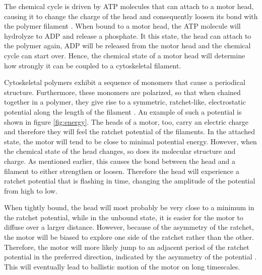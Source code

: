 \documentclass[aps,pre,twocolumn,showpacs,showkeys,superscriptaddress,floatfix]{revtex4-1}
\begin{document}
The chemical cycle is driven by ATP molecules that can attach to a motor head, causing it to change the charge of the head and consequently loosen its bond with the polymer filament \cite{adelstein1980regulation}. 
When bound to a motor head, the ATP molecule will hydrolyze to ADP and release a phosphate. 
It this state, the head can attach to the polymer again, ADP will be released from the motor head and the chemical cycle can start over. 
Hence, the chemical state of a motor head will determine how strongly it can be coupled to a cytoskeletal filament. 


Cytoskeletal polymers exhibit a sequence of monomers that cause a periodical structure. 
Furthermore, these monomers are polarized, so that when chained together in a polymer, they give rise to a symmetric, ratchet-like, electrostatic potential along the length of the filament \cite{Nie2014,nie2014conformational}. 
An example of such a potential is shown in figure \ref{fig:energy}. 
The heads of a motor, too, carry an electric charge and therefore they will feel the ratchet potential of the filaments. 
In the attached state, the motor will tend to be close to minimal potential energy. 
However, when the chemical state of the head changes, so does its molecular structure and charge. 
As mentioned earlier, this causes the bond between the head and a filament to either strengthen or loosen. 
Therefore the head will experience a ratchet potential that is flashing in time, changing the amplitude of the potential from high to low.


When tightly bound, the head will most probably be very close to a minimum in the ratchet potential, while in the unbound state, it is easier for the motor to diffuse over a larger distance. 
However, because of the asymmetry of the ratchet, the motor will be biased to explore one side of the ratchet rather than the other. 
Therefore, the motor will more likely jump to an adjacent period of the ratchet potential in the preferred direction, indicated by the asymmetry of the potential \cite{reimann2002brownian}.  
This will eventually lead to ballistic motion of the motor on long timescales. 
\end{document}
